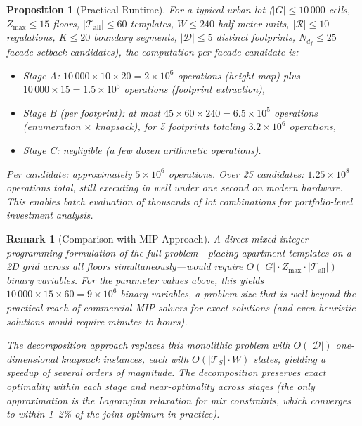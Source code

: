 \documentclass[11pt,a4paper]{article}
\newtheorem{proposition}{Proposition}
\newtheorem{remark}{Remark}
\newcommand{\calT}{\mathcal{T}}
\newcommand{\calR}{\mathcal{R}}
\begin{document}
\begin{proposition}[Practical Runtime]
For a typical urban lot ($|G| \leq 10\,000$ cells, $Z_{\max} \leq 15$
floors, $|\calT_{\text{all}}| \leq 60$ templates, $W \leq 240$
half-meter units, $|\calR| \leq 10$ regulations, $K \leq 20$ boundary
segments, $|\mathcal{D}| \leq 5$ distinct footprints, $N_{d_f} \leq 25$
facade setback candidates), the computation per facade candidate is:
\begin{itemize}[nosep]
    \item Stage A: $10\,000 \times 10 \times 20 = 2 \times 10^6$ operations (height map) plus $10\,000 \times 15 = 1.5 \times 10^5$ operations (footprint extraction),
    \item Stage B (per footprint): at most $45 \times 60 \times 240 = 6.5 \times 10^5$ operations (enumeration $\times$ knapsack), for 5 footprints totaling $3.2 \times 10^6$ operations,
    \item Stage C: negligible (a few dozen arithmetic operations).
\end{itemize}
Per candidate: approximately $5 \times 10^6$ operations. Over 25
candidates: $1.25 \times 10^8$ operations total, still executing in
well under one second on modern hardware. This enables batch evaluation
of thousands of lot combinations for portfolio-level investment analysis.
\end{proposition}

\begin{remark}[Comparison with MIP Approach]
A direct mixed-integer programming formulation of the full problem---placing
apartment templates on a 2D grid across all floors simultaneously---would
require $O(|G| \cdot Z_{\max} \cdot |\calT_{\text{all}}|)$ binary
variables. For the parameter values above, this yields
$10\,000 \times 15 \times 60 = 9 \times 10^6$ binary variables, a
problem size that is well beyond the practical reach of commercial MIP
solvers for exact solutions (and even heuristic solutions would require
minutes to hours).

The decomposition approach replaces this monolithic problem with
$O(|\mathcal{D}|)$ one-dimensional knapsack instances, each with
$O(|\calT_S| \cdot W)$ states, yielding a speedup of several orders of
magnitude. The decomposition preserves exact optimality within each
stage and near-optimality across stages (the only approximation is the
Lagrangian relaxation for mix constraints, which converges to within
1--2\% of the joint optimum in practice).
\end{remark}
\end{document}
